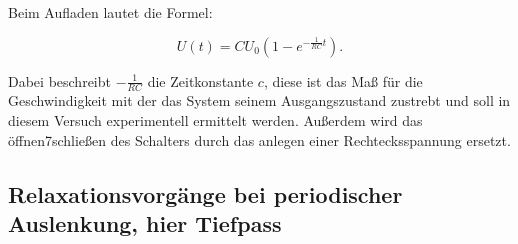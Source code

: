 Beim Aufladen lautet die Formel:

\begin{equation}
    U(t)= CU_{0}(1-e^{-\frac{1}{RC}t}) . \label{eqn:Aufladen}
\end{equation}

Dabei beschreibt $-\frac{1}{RC}$ die Zeitkonstante $c$, diese ist das Maß für die Geschwindigkeit mit der das System seinem
Ausgangszustand zustrebt und soll in diesem Versuch experimentell ermittelt werden.
Außerdem wird das öffnen7schließen des Schalters durch das anlegen einer Rechtecksspannung ersetzt.

\subsection{Relaxationsvorgänge bei periodischer Auslenkung, hier Tiefpass}



\cite{sample}

